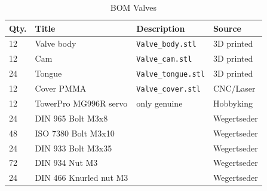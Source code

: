 \documentclass[a4paper]{scrartcl}
\begin{document}
\begin{table}
\caption{BOM Valves}
\begin{tabular}{|l|l|l|l|}
\hline
Qty. & Title & Description & Source\\
\hline\hline
12 & Valve body & \texttt{Valve\_body.stl} & 3D printed \\
\hline 
12 & Cam & \texttt{Valve\_cam.stl} & 3D printed\\
\hline
24 & Tongue & \texttt{Valve\_tongue.stl} & 3D printed\\
\hline
12 & Cover PMMA & \texttt{Valve\_cover.stl} & CNC/Laser \\
\hline 
12 & TowerPro MG996R servo & only genuine & Hobbyking\\
\hline 
24 & DIN 965 Bolt M3x8 & & Wegertseder\\
\hline
48 & ISO 7380 Bolt M3x10 &  & Wegertseder\\
\hline
24 & DIN 933 Bolt M3x35 &  & Wegertseder\\
\hline
72 & DIN 934 Nut M3 & & Wegertseder\\
\hline 
24 & DIN 466 Knurled nut M3 &  & Wegertseder\\
\hline 

\end{tabular}
\end{table}
\end{document}

